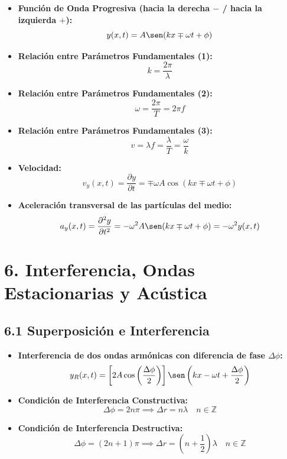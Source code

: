 \documentclass[11pt,a4paper]{article}
\begin{document}
\begin{itemize}
  \item \textbf{Función de Onda Progresiva (hacia la derecha $-$ / hacia la izquierda $+$):}
  \[
    y(x, t) = A \sen(k x \mp \omega t + \phi)
  \]
  \item \textbf{Relación entre Parámetros Fundamentales (1):}
  \[
    k = \frac{2\pi}{\lambda}
  \]
  \item \textbf{Relación entre Parámetros Fundamentales (2):}
  \[
    \omega = \frac{2\pi}{T} = 2\pi f
  \]
  \item \textbf{Relación entre Parámetros Fundamentales (3):}
  \[
    v = \lambda f = \frac{\lambda}{T} = \frac{\omega}{k}
  \]
  \item \textbf{Velocidad:}
  \[
    v_y(x, t) = \frac{\partial y}{\partial t} = \mp \omega A \cos(k x \mp \omega t + \phi)
  \]
  \item \textbf{Aceleración transversal de las partículas del medio:}
  \[
    a_y(x, t) = \frac{\partial^2 y}{\partial t^2} = -\omega^2 A \sen(k x \mp \omega t + \phi) = -\omega^2 y(x, t)
  \]
\end{itemize}

\section*{6. Interferencia, Ondas Estacionarias y Acústica}

\subsection*{6.1 Superposición e Interferencia}

\begin{itemize}
  \item \textbf{Interferencia de dos ondas armónicas con diferencia de fase $\Delta\phi$:}
  \[
    y_R(x, t) = \left[ 2A \cos\left(\frac{\Delta\phi}{2}\right) \right] \sen\left(kx - \omega t + \frac{\Delta\phi}{2}\right)
  \]
  \item \textbf{Condición de Interferencia Constructiva:}
  \[
    \Delta\phi = 2n\pi \implies \Delta r = n\lambda \quad n \in \mathbb{Z}
  \]
  \item \textbf{Condición de Interferencia Destructiva:}
  \[
    \Delta\phi = (2n + 1)\pi \implies \Delta r = \left(n + \frac{1}{2}\right)\lambda \quad n \in \mathbb{Z}
  \]
\end{itemize}
\end{document}
